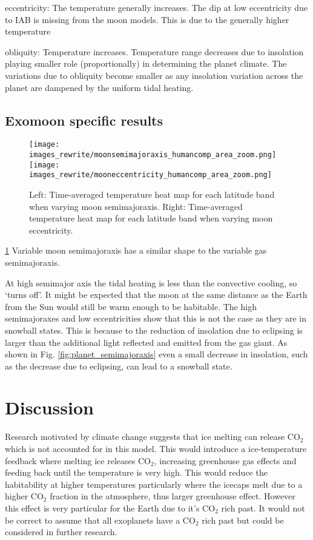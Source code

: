 \documentclass[12pt, onecolumn]{revtex4-2}    %
\begin{document}
eccentricity:
The temperature generally increases.
The dip at low eccentricity due to IAB is missing from the moon models.
This is due to the generally higher temperature 

obliquity:
Temperature increases.
Temperature range decreases due to insolation playing smaller role (proportionally) in determining the planet climate.
The variations due to obliquity become smaller as any insolation variation across the planet are dampened by the uniform tidal heating.

\subsection{Exomoon specific results} \label{ssec:Exomoon_specific_results}
%
\begin{figure}[t]
  \texttt{[image: images\_rewrite/moonsemimajoraxis\_humancomp\_area\_zoom.png]}
  \texttt{[image: images\_rewrite/mooneccentricity\_humancomp\_area\_zoom.png]}
  \caption{
    Left:  Time-averaged temperature heat map for each latitude band when varying moon semimajoraxis.
    Right: Time-averaged temperature heat map for each latitude band when varying moon eccentricity.
  }
  \label{fig:moon_semimajoraxis_eccentricity}
\end{figure}

\ref{fig:moon_semimajoraxis_eccentricity}
Variable moon semimajoraxis has a similar shape to the variable gas semimajoraxis.

At high semimajor axis the tidal heating is less than the convective cooling, so `turns off'.
It might be expected that the moon at the same distance as the Earth from the Sun would still be warm enough to be habitable.
The high semimajoraxes and low eccentricities show that this is not the case as they are in snowball states.
This is because to the reduction of insolation due to eclipsing is larger than the additional light reflected and emitted from the gas giant.
As shown in Fig. \ref{fig:planet_semimajoraxis} even a small decrease in insolation, such as the decrease due to eclipsing, can lead to a snowball state.

\section{Discussion} \label{sec:Discussion}
Research motivated by climate change suggests that ice melting can release CO$_2$ which is not accounted for in this model.
This would introduce a ice-temperature feedback where melting ice releases CO$_2$, increasing greenhouse gas effects and feeding back until the temperature is very high.
This would reduce the habitability at higher temperatures particularly where the icecaps melt due to a higher CO$_2$ fraction in the atmosphere, thus larger greenhouse effect.
However this effect is very particular for the Earth due to it's CO$_2$ rich past.
It would not be correct to assume that all exoplanets have a CO$_2$ rich past but could be considered in further research.
\end{document}
